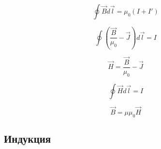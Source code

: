 \begin{equation}
\oint \overrightarrow{B} d \overrightarrow{l} = \mu_0 (I+I')
\end{equation}

\begin{equation}
\oint ( \frac{\overrightarrow{B}}{\mu_0} - \overrightarrow{J}) d \overrightarrow{l} = I
\end{equation}

\begin{equation}
\overrightarrow{H} = \frac{\overrightarrow{B}}{\mu_0} - \overrightarrow{J}
\end{equation}


\begin{equation}
\oint \overrightarrow{H} d \overrightarrow{l} = I
\end{equation}


\begin{equation}
\overrightarrow{B} = \mu \mu_0 \overrightarrow{H}
\end{equation}


\subsection{Индукция}


